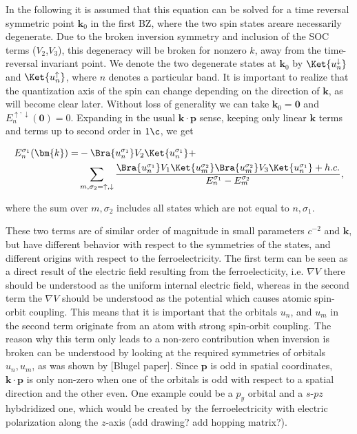 In the following it is assumed that this equation can be solved for a time reversal symmetric point $\bm{k}_0$ in the first BZ, where the two spin states areare necessarily degenerate. Due to the broken inversion symmetry and inclusion of the SOC terms ($V_2$,$V_3$), this degeneracy will be broken for nonzero $k$, away from the time-reversal invariant point.
We denote the two degenerate states at $\bm{k}_0$ by $\Ket{u_n^\downarrow}$ and $\Ket{u_n^\uparrow}$, where $n$ denotes a particular band. It is important to realize that the quantization axis of the spin can change depending on the direction of $\bm{k}$, as will become clear later.
Without loss of generality we can take $\bm{k}_0 = \bm{0}$ and $E^{\uparrow,\downarrow}_n(\bm{0}) = 0$.
Expanding in the usual $\bm{k}\cdot\bm{p}$ sense, keeping only linear $\bm{k}$ terms and terms up to second order in $1\c$, we get

\begin{align}
	\label{eq:kp_expansion}
	E_n^{\sigma_1}(\bm{k}) =& - \Bra{u_n^{\sigma_1}} V_2 \Ket{u_n^{\sigma_1}} + \\
		& \sum_{m,\sigma_2=\uparrow,\downarrow}\frac{\Bra{u_n^{\sigma_1}} V_1 \Ket{u_m^{\sigma_2}}\Bra{u_m^{\sigma_2}} V_3 \Ket{u_n^{\sigma_1}} + h.c.}{E_n^{\sigma_1} - E_m^{\sigma_2}},
\end{align}

where the sum over $m, \sigma_2$ includes all states which are not equal to $n, \sigma_1$. 



These two terms are of similar order of magnitude in small parameters $c^{-2}$ and $\bm{k}$, but have different behavior with respect to the symmetries of the states, and different origins with respect to the ferroelectricity. The first term can be seen as a direct result of the electric field resulting from the ferroelecticity, i.e. $\nabla V$ there should be understood as the uniform internal electric field, whereas in the second term the $\nabla V$ should be understood as the potential which causes atomic spin-orbit coupling. This means that it is important that the orbitals $u_n$, and $u_m$ in the second term originate from an atom with strong spin-orbit coupling. The reason why this term only leads to a non-zero contribution when inversion is broken can be understood by looking at the required symmetries of orbitals $u_n, u_m$, as was shown by [Blugel paper]. Since $\bm{p}$ is odd in spatial coordinates, $\bm{k} \cdot \bm{p}$ is only non-zero when one of the orbitals is odd with respect to a spatial direction and the other even. One example could be a $p_y$ orbital and a $s$-$pz$ hybdridized one, which would be created by the ferroelectricity with electric polarization along the $z$-axis (add drawing? add hopping matrix?).



